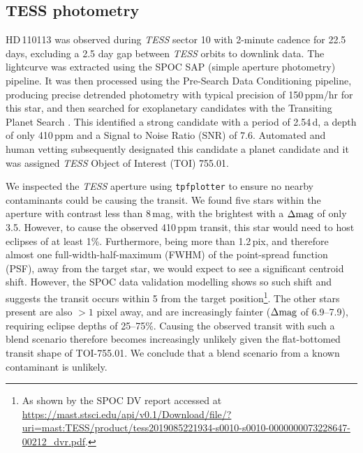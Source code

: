 \documentclass[fleqn,usenatbib]{mnras}
\newcommand{\tess}{{\it TESS}}
\newcommand{\Tdepth}{410\,ppm}
\newcommand{\Tstar}{HD\,110113}
\begin{document}
\subsection{TESS photometry}
\Tstar{} was observed during \tess{} sector 10 with 2-minute cadence for 22.5 days, excluding a 2.5 day gap between \tess{} orbits to downlink data.
The lightcurve was extracted using the SPOC \citep[Science Processing Operations Centre;][]{jenkins2016tess} SAP (simple aperture photometry) pipeline.
It was then processed using the Pre-Search Data Conditioning \citep[PDC,][]{stumpe2012kepler,2012PASP..124.1000S,stumpe2014multiscale} pipeline, producing precise detrended photometry with typical precision of 150\,ppm/hr for this star, and then searched for exoplanetary candidates with the Transiting Planet Search \citep[TPS;][]{2010SPIE.7740E..0DJ}.
This identified a strong candidate with a period of 2.54\,d, a depth of only \Tdepth{} and a Signal to Noise Ratio (SNR) of 7.6.
Automated and human vetting subsequently designated this candidate a planet candidate and it was assigned \tess{} Object of Interest (TOI) 755.01. 

We inspected the \tess{} aperture using \texttt{tpfplotter} \citep[plotted in Figure \ref{fig:tpf};][]{2020A&A...635A.128A} to ensure no nearby contaminants could be causing the transit.
We found five stars within the aperture with contrast less than 8\,mag, with the brightest with a $\Delta{\rm mag}$ of only 3.5.
However, to cause the observed \Tdepth{} transit, this star would need to host eclipses of at least 1\%. 
Furthermore, being more than 1.2\,pix, and therefore almost one full-width-half-maximum (FWHM) of the point-spread function (PSF), away from the target star, we would expect to see a significant centroid shift. 
However, the SPOC data validation modelling \citep{Twicken:DVdiagnostics2018,Li:DVmodelFit2019} shows so such shift and suggests the transit occurs within 5\arcsec{} from the target position\footnote{As shown by the SPOC DV report accessed at \url{https://mast.stsci.edu/api/v0.1/Download/file/?uri=mast:TESS/product/tess2019085221934-s0010-s0010-0000000073228647-00212_dvr.pdf}.}.
The other stars present are also $>1$ pixel away, and are increasingly fainter ($\Delta{\rm mag}$ of 6.9--7.9), requiring eclipse depths of 25--75\%.
Causing the observed transit with such a blend scenario therefore becomes increasingly unlikely given the flat-bottomed transit shape of TOI-755.01.
We conclude that a blend scenario from a known contaminant is unlikely.
\end{document}
